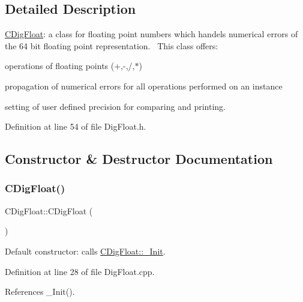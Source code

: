 \subsection{Detailed Description}
\hyperlink{classCDigFloat}{C\+Dig\+Float}\+: a class for floating point numbers which handels numerical errors of the 64 bit floating point representation.~\newline
 This class offers\+: 


\begin{DoxyItemize}
\item operations of floating points (+,-\/,/,$\ast$)
\item propagation of numerical errors for all operations performed on an instance
\item setting of user defined precision for comparing and printing. 
\end{DoxyItemize}

Definition at line 54 of file Dig\+Float.\+h.



\subsection{Constructor \& Destructor Documentation}
\mbox{\label{classCDigFloat_ac16694fac9b3b0350f5d02888638ae20}} 
\subsubsection{\texorpdfstring{C\+Dig\+Float()}{CDigFloat()}\hspace{0.1cm}{\footnotesize\ttfamily [1/3]}}
{\footnotesize\ttfamily C\+Dig\+Float\+::\+C\+Dig\+Float (\begin{DoxyParamCaption}{ }\end{DoxyParamCaption})}



Default constructor\+: calls \hyperlink{classCDigFloat_a89a0dda21c74c115ac41b432031666a6}{C\+Dig\+Float\+::\+\_\+\+Init}. 



Definition at line 28 of file Dig\+Float.\+cpp.



References \+\_\+\+Init().

\mbox{\label{classCDigFloat_a980c2c8c16275a8f838f2f7dc9b3670b}} 
